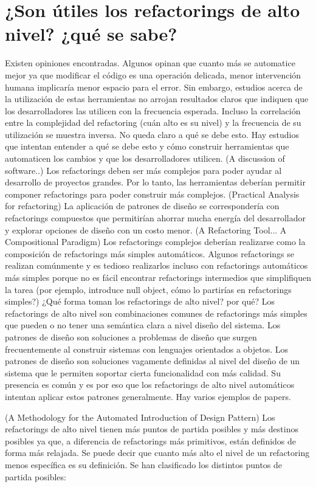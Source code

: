 \section{¿Son útiles los refactorings de alto nivel? ¿qué se sabe?}
Existen opiniones encontradas. Algunos
opinan que cuanto más se automatice mejor ya que modificar el código es una operación delicada,
menor intervención humana implicaría menor espacio para el error. Sin embargo, estudios acerca
de la utilización de estas herramientas no arrojan resultados claros que indiquen que los
desarrolladores las utilicen con la frecuencia esperada. Incluso la correlación entre la
complejidad del refactoring (cuán alto es su nivel) y la frecuencia de su utilización se muestra
inversa. No queda claro a qué se debe esto. Hay estudios que intentan entender a qué se debe
esto y cómo construir herramientas que automaticen los cambios y que los desarrolladores
utilicen. (A discussion of software..) Los refactorings deben ser más complejos para poder
ayudar al desarrollo de proyectos grandes. Por lo tanto, las herramientas deberían permitir
componer refactorings para poder construir más complejos. (Practical Analysis for refactoring)
La aplicación de patrones de diseño se correspondería con refactorings compuestos que
permitirían ahorrar mucha energía del desarrollador y explorar opciones de diseño con un costo
menor. (A Refactoring Tool... A Compositional Paradigm) Los refactorings complejos deberían
realizarse como la composición de refactorings más simples automáticos. Algunos refactorings se
realizan comúnmente y es tedioso realizarlos incluso con refactorings automáticos más simples
porque no es fácil encontrar refactorings intermedios que simplifiquen la tarea (por ejemplo,
introduce null object, cómo lo partirías en refactorings simples?) ¿Qué forma toman los
refactorings de alto nivel? por qué? Los refactorings de alto nivel son combinaciones comunes de
refactorings más simples que pueden o no tener una semántica clara a nivel diseño del sistema.
Los patrones de diseño son soluciones a problemas de diseño que surgen frecuentemente al
construir sistemas con lenguajes orientados a objetos. Los patrones de diseño son soluciones
vagamente definidas al nivel del diseño de un sistema que le permiten soportar cierta
funcionalidad con más calidad. Su presencia es común y es por eso que los refactorings de alto
nivel automáticos intentan aplicar estos patrones generalmente. Hay varios ejemplos de papers.

(A Methodology for the Automated Introduction of Design Pattern) Los refactorings de alto nivel
tienen más puntos de partida posibles y más destinos posibles ya que, a diferencia de refactorings
más primitivos, están definidos de forma más relajada. Se puede decir que cuanto más alto el nivel
de un refactoring menos específica es su definición. Se han clasificado los distintos puntos de
partida posibles: 

